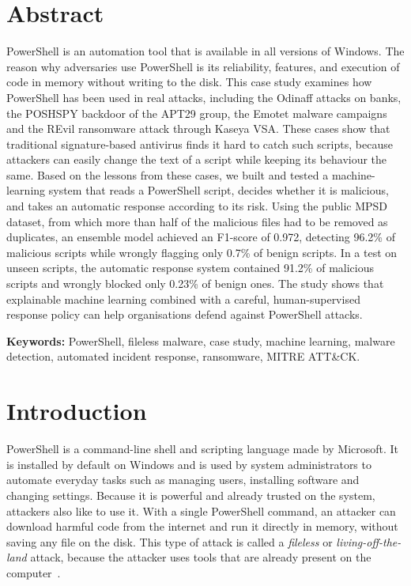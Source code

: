 \documentclass[12pt,a4paper]{article}
\newcommand{\attck}{ATT\&CK}
\begin{document}
\section*{Abstract}
PowerShell is an automation tool that is available in all versions of Windows. The reason why adversaries use PowerShell is its reliability, features, and execution of code in memory without writing to the disk. This case study examines how PowerShell has been used in real attacks, including the Odinaff attacks on banks, the POSHSPY backdoor of the APT29 group, the Emotet malware campaigns and the REvil ransomware attack through Kaseya VSA. These cases show that traditional signature-based antivirus finds it hard to catch such scripts, because attackers can easily change the text of a script while keeping its behaviour the same. Based on the lessons from these cases, we built and tested a machine-learning system that reads a PowerShell script, decides whether it is malicious, and takes an automatic response according to its risk. Using the public MPSD dataset, from which more than half of the malicious files had to be removed as duplicates, an ensemble model achieved an F1-score of 0.972, detecting 96.2\% of malicious scripts while wrongly flagging only 0.7\% of benign scripts. In a test on unseen scripts, the automatic response system contained 91.2\% of malicious scripts and wrongly blocked only 0.23\% of benign ones. The study shows that explainable machine learning combined with a careful, human-supervised response policy can help organisations defend against PowerShell attacks.

\vspace{0.3cm}
\noindent\textbf{Keywords:} PowerShell, fileless malware, case study, machine learning, malware detection, automated incident response, ransomware, MITRE \attck{}.

\clearpage

\section{Introduction}
PowerShell is a command-line shell and scripting language made by Microsoft. It is installed by default on Windows and is used by system administrators to automate everyday tasks such as managing users, installing software and changing settings. Because it is powerful and already trusted on the system, attackers also like to use it. With a single PowerShell command, an attacker can download harmful code from the internet and run it directly in memory, without saving any file on the disk. This type of attack is called a \emph{fileless} or \emph{living-off-the-land} attack, because the attacker uses tools that are already present on the computer~\cite{wueest2017}.
\end{document}
